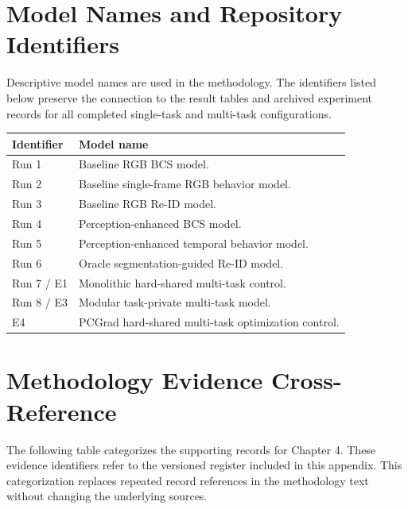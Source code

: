 \section{Model Names and Repository Identifiers}

Descriptive model names are used in the methodology. The identifiers listed below preserve the connection to the result tables and archived experiment records for all completed single-task and multi-task configurations.

\begin{longtable}{@{}p{2.5cm}p{11.4cm}@{}}
\toprule
\textbf{Identifier} & \textbf{Model name}\\
\midrule
Run 1 & Baseline RGB BCS model.\\
Run 2 & Baseline single-frame RGB behavior model.\\
Run 3 & Baseline RGB Re-ID model.\\
Run 4 & Perception-enhanced BCS model.\\
Run 5 & Perception-enhanced temporal behavior model.\\
Run 6 & Oracle segmentation-guided Re-ID model.\\
Run 7 / E1 & Monolithic hard-shared multi-task control.\\
Run 8 / E3 & Modular task-private multi-task model.\\
E4 & PCGrad hard-shared multi-task optimization control.\\
\bottomrule
\end{longtable}

\section{Methodology Evidence Cross-Reference}

The following table categorizes the supporting records for Chapter 4. These evidence identifiers refer to the versioned register included in this appendix. This categorization replaces repeated record references in the methodology text without changing the underlying sources.

